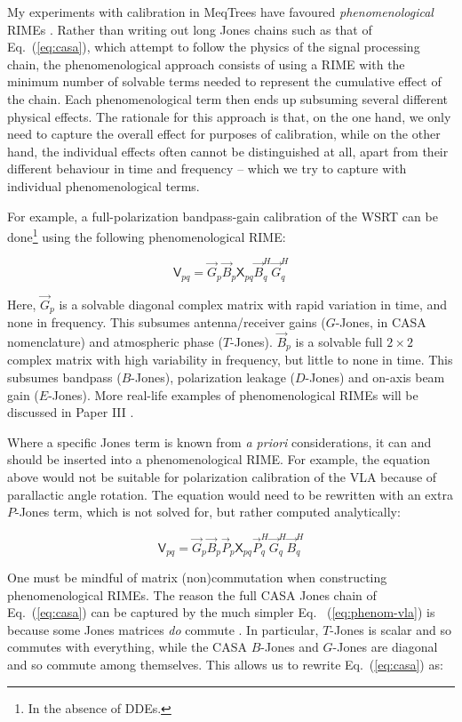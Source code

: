 \documentclass{aa}
\newcommand{\herm}{H}
\newcommand{\jones}[2]{\vec {#1}_{#2}}
\newcommand{\jonesT}[2]{\vec {#1}^{\herm}_{#2}}
\newcommand{\coh}[2]{\mathsf{{#1}}_{{#2}}}
\begin{document}
My experiments with calibration in MeqTrees have favoured \emph{phenomenological} RIMEs \citep{meqtrees}. Rather than writing out long Jones chains such as that of Eq.~(\ref{eq:casa}), which attempt to follow the physics of the signal processing chain, the phenomenological approach consists of using a RIME with the minimum number of solvable terms needed to represent the cumulative effect of the chain. Each phenomenological term then ends up subsuming several different physical effects. The rationale for this approach is that, on the one hand, we only need to capture the overall effect for purposes of calibration, while on the other hand, the individual effects often cannot be distinguished at all, apart from their different behaviour in time and frequency -- which we try to capture with individual phenomenological terms.

For example, a full-polarization bandpass-gain calibration of the WSRT can be done\footnote{In the absence of DDEs.} using the following phenomenological RIME:

\[
\coh{V}{pq} = \jones{G}{p} \jones{B}{p} \coh{X}{pq} \jonesT{B}{q} \jonesT{G}{q} 
\]

Here, $\jones{G}{p}$ is a solvable diagonal complex matrix with rapid variation in time, and none in frequency. This subsumes antenna/receiver gains ($G$-Jones, in CASA nomenclature) and atmospheric phase ($T$-Jones). $\jones{B}{p}$ is a solvable full $2\times2$ complex matrix with high variability in frequency, but little to none in time. This subsumes bandpass ($B$-Jones), polarization leakage ($D$-Jones) and on-axis beam gain ($E$-Jones). More real-life examples of phenomenological RIMEs will be discussed in Paper III \citep{RRIME3}.

Where a specific Jones term is known from \emph{a priori} considerations, it can and should be inserted into a phenomenological RIME. For example, the equation above would not be suitable for polarization calibration of the VLA because of parallactic angle rotation. The equation would need to be rewritten with an extra $P$-Jones term, which is not solved for, but rather computed analytically:

\begin{equation}\label{eq:phenom-vla}
\coh{V}{pq} = \jones{G}{p} \jones{B}{p} \jones{P}{p} \coh{X}{pq} \jonesT{P}{q} \jonesT{G}{q} \jonesT{B}{q} 
\end{equation}

One must be mindful of matrix (non)commutation when constructing phenomenological RIMEs. The reason the full CASA Jones chain of Eq.~(\ref{eq:casa}) can be captured by the much simpler Eq. ~(\ref{eq:phenom-vla}) is because some Jones matrices \emph{do} commute \citep[see also Paper I,][Sect.~1.6]{RRIME1}. In particular, $T$-Jones is scalar and so commutes with everything, while the CASA $B$-Jones and $G$-Jones are diagonal and so commute among themselves. This allows us to rewrite Eq.~(\ref{eq:casa}) as:
\end{document}
